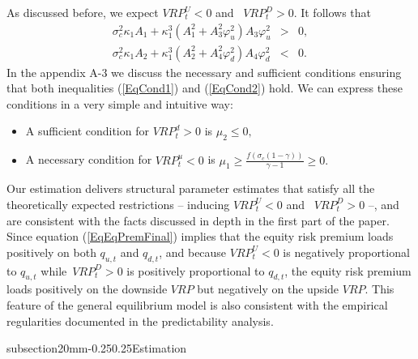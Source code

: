 \documentclass[11pt]{article}
\makeatletter
\renewcommand\subsection{\@startsection%
    {subsection}{2}{0mm}{-0.25\baselineskip}{0.25\baselineskip}{\bfseries\large}}
\makeatother
\begin{document}
As discussed before, we expect $VRP_{t}^{U}<0$ and \ $VRP_{t}^{D}>0$. It
follows that%
\begin{eqnarray}
\sigma _{c}^{2}\kappa _{1}A_{1}+\kappa _{1}^{3}\left(
A_{1}^{2}+A_{3}^{2}\varphi _{u}^{2}\right) A_{3}\varphi _{u}^{2} &>&0,\label{EqCond1} \\
\sigma _{c}^{2}\kappa _{1}A_{2}+\kappa _{1}^{3}\left(
A_{2}^{2}+A_{4}^{2}\varphi _{d}^{2}\right) A_{4}\varphi _{d}^{2} &<&0\label{EqCond2}.
\end{eqnarray}%
In the appendix A-3 we discuss the necessary and sufficient conditions ensuring that both inequalities (\ref{EqCond1}) and (\ref{EqCond2}) hold. We can express these conditions in a very simple and intuitive way:
\begin{itemize}
  \item A sufficient condition for $VRP_{t}^{d}>0$ is $\mu _{2}\leq 0,$
  \item A necessary condition for $VRP_{t}^{u}<0$ is $\mu _{1}\geq \frac{f\left( \sigma _{c}(1-\gamma )\right) }{\gamma -1} \geq 0.$
\end{itemize}
Our estimation delivers structural parameter estimates that satisfy all the theoretically expected restrictions -- inducing $VRP_{t}^{U}<0$ and \ $VRP_{t}^{D}>0$ --, and are consistent with the facts discussed in depth in the first part of the paper. Since equation (\ref{EqEqPremFinal}) implies that the equity risk premium loads positively on both $q_{u,t}$ and $q_{d,t}$, and because $VRP_{t}^{U}<0$ is negatively proportional to $q_{u,t}$ while\ $VRP_{t}^{D}>0$ is positively proportional to $q_{d,t}$, the equity risk premium loads positively on the downside $VRP$ but negatively on the upside $VRP$. This feature of the general equilibrium model is also consistent with the empirical regularities documented in the predictability analysis.

\subsection{Estimation}
\end{document}
